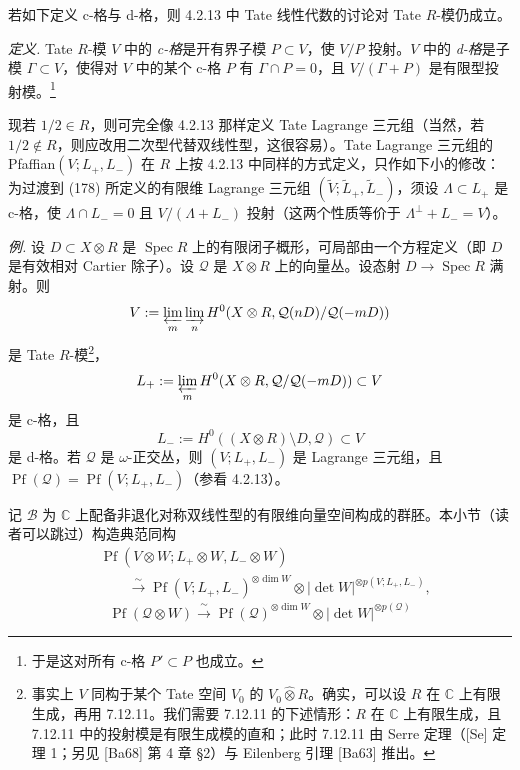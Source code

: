 若如下定义 c-格与 d-格，则 4.2.13 中 Tate 线性代数的讨论对 Tate $R$-模仍成立。

\emph{定义.} Tate $R$-模 $V$ 中的 \emph{c-格}是开有界子模 $P\subset V$，使 $V/P$ 投射。$V$ 中的 \emph{d-格}是子模 $\Gamma\subset V$，使得对 $V$ 中的某个 c-格 $P$ 有 $\Gamma\cap P=0$，且 $V/(\Gamma+P)$ 是有限型投射模。\footnote{于是这对所有 c-格 $P'\subset P$ 也成立。}

现若 $1/2\in R$，则可完全像 4.2.13 那样定义 Tate Lagrange 三元组（当然，若 $1/2\notin R$，则应改用二次型代替双线性型，这很容易）。Tate Lagrange 三元组的 Pfaffian$(V;L_{+},L_{-})$ 在 $R$ 上按 4.2.13 中同样的方式定义，只作如下小的修改：为过渡到 (178) 所定义的有限维 Lagrange 三元组 $(\tilde{V};\tilde{L}_{+},\tilde{L}_{-})$，须设 $\Lambda\subset L_{+}$ 是 c-格，使 $\Lambda\cap L_{-}=0$ 且 $V/(\Lambda+L_{-})$ 投射（这两个性质等价于 $\Lambda^{\perp}+L_{-}=V$）。

\emph{例.} 设 $D\subset X\otimes R$ 是 $\operatorname{Spec}R$ 上的有限闭子概形，可局部由一个方程定义（即 $D$ 是有效相对 Cartier 除子）。设 $\mathcal{Q}$ 是 $X\otimes R$ 上的向量丛。设态射 $D\to\operatorname{Spec}R$ 满射。则
\[
V:=\varprojlim_{m}\varinjlim_{n}H^{0}(X\otimes R,\mathcal{Q}(nD)/\mathcal{Q}(-mD))
\]
是 Tate $R$-模\footnote{事实上 $V$ 同构于某个 Tate 空间 $V_{0}$ 的 $V_{0}\hat{\otimes}R$。确实，可以设 $R$ 在 $\mathbb{C}$ 上有限生成，再用 7.12.11。我们需要 7.12.11 的下述情形：$R$ 在 $\mathbb{C}$ 上有限生成，且 7.12.11 中的投射模是有限生成模的直和；此时 7.12.11 由 Serre 定理（[Se] 定理 1；另见 [Ba68] 第 4 章 §2）与 Eilenberg 引理 [Ba63] 推出。}，
\[
L_{+}:=\varprojlim_{m}H^{0}(X\otimes R,\mathcal{Q}/\mathcal{Q}(-mD))\subset V
\]
是 c-格，且
\[
L_{-}:=H^{0}((X\otimes R)\setminus D,\mathcal{Q})\subset V
\]
是 d-格。若 $\mathcal{Q}$ 是 $\omega$-正交丛，则 $(V;L_{+},L_{-})$ 是 Lagrange 三元组，且 $\operatorname{Pf}(\mathcal{Q})=\operatorname{Pf}(V;L_{+},L_{-})$（参看 4.2.13）。

 记 $\mathcal{B}$ 为 $\mathbb{C}$ 上配备非退化对称双线性型的有限维向量空间构成的群胚。本小节（读者可以跳过）构造典范同构
\begin{equation}\tag{183}
\begin{aligned}
&\operatorname{Pf}(V\otimes W;L_{+}\otimes W,L_{-}\otimes W)\\
&\qquad\xrightarrow{\ \sim\ }\operatorname{Pf}(V;L_{+},L_{-})^{\otimes\dim W}\otimes|\det W|^{\otimes p(V;L_{+},L_{-})},
\end{aligned}
\end{equation}
\begin{equation}\tag{184}
\operatorname{Pf}(\mathcal{Q}\otimes W)\xrightarrow{\ \sim\ }\operatorname{Pf}(\mathcal{Q})^{\otimes\dim W}\otimes|\det W|^{\otimes p(\mathcal{Q})}
\end{equation}


